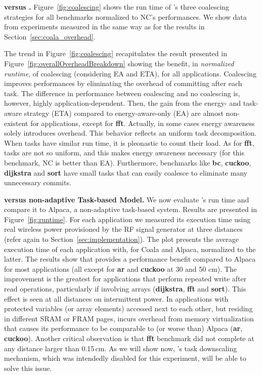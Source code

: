 \textbf{\sys versus \sys.} Figure~\ref{fig:coalescing} shows the run time of \sys's three coalescing strategies for all benchmarks normalized to NC's performances. We show data from experiments measured in the same way as for the results in Section~\ref{sec:coala_overhead}. 

The trend in Figure~\ref{fig:coalescing} recapitulates the result presented in Figure~\ref{fig:overallOverheadBreakdown} showing the benefit, in \emph {normalized runtime}, of coalescing (considering EA and ETA), for all applications. Coalescing improves performances by eliminating the overhead of committing after each task. The difference in performance between coalescing and no coalescing is, however, highly application-dependent. Then, the gain from the energy- and task-aware strategy (ETA) compared to energy-aware-only (EA) are almost non-existent for applications, except for \textbf{fft}. Actually, in some cases energy awareness solely introduces overhead. This behavior reflects an uniform task decomposition. When tasks have similar run time, it is pleonastic to count their load. As for \textbf{fft}, tasks are not so uniform, and this makes energy awareness necessary (for this benchmark, NC is better than EA).
Furthermore, benchmarks like \textbf{bc}, \textbf{cuckoo}, \textbf{dijkstra} and \textbf{sort} have small tasks that \sys can easily coalesce to eliminate many unnecessary commits.

\textbf{\sys versus non-adaptive Task-based Model.} We now evaluate \sys's run time and compare it to Alpaca, a non-adaptive task-based system. Results are presented in Figure~\ref{fig:runtime}. For each application we measured its execution time using real wireless power provisioned by the RF signal generator at three distances (refer again to Section~\ref{sec:implementation}).
%
The plot presents the average execution time of each application with, for Coala and Alpaca, normalized to the latter. The results show that \sys provides a performance benefit compared to Alpaca for most applications (all except for \textbf{ar} and \textbf{cuckoo} at 30 and 50 cm). The improvement is the greatest for applications that perform repeated write after read operations, particularly if involving arrays (\textbf{dijkstra}, \textbf{fft} and \textbf{sort}). This effect is seen at all distances on intermittent power. In applications with protected variables (or array elements) accessed next to each other, but residing in different SRAM or FRAM pages, \sys incurs overhead from memory virtualization that causes its performance to be comparable to (or worse than) Alpaca (\textbf{ar}, \textbf{cuckoo}).
%
Another critical observation is that \textbf{fft} benchmark did not complete at any distance larger than 0.15\,cm. As we will show now, \sys's task downscaling mechanism, which was intendedly disabled for this experiment, will be able to solve this issue.

